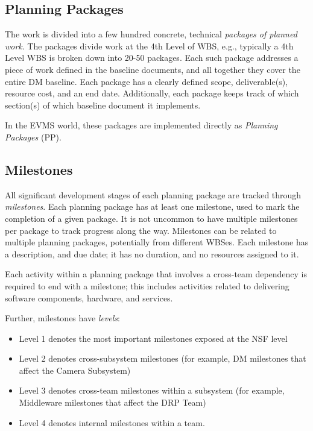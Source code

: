 \documentclass[DM,toc]{lsstdoc}
\newcommand{\sphinxstyleemphasis}{\emph}
\begin{document}
\subsection{Planning Packages}
\label{\detokenize{index:planning-packages}}
The work is divided into a few hundred concrete, technical \sphinxstyleemphasis{packages of planned work}. The packages divide work
at the 4th Level of WBS, e.g., typically a 4th Level WBS is broken down into 20-50 packages. Each such package
addresses a piece of work defined in the baseline documents, and all together they cover the entire DM baseline.
Each package has a clearly defined scope, deliverable(s), resource cost, and an end date. Additionally,
each package keeps track of which section(s) of which baseline document it implements.

In the EVMS world, these packages are implemented directly as \sphinxstyleemphasis{Planning Packages} (PP).


\subsection{Milestones}
\label{\detokenize{index:milestones}}
All significant development stages of each planning package are tracked through \sphinxstyleemphasis{milestones}.
Each planning package has at least one milestone, used to mark the completion of a given package.
It is not uncommon to have multiple milestones per package to track progress along the way.
Milestones can be related to multiple planning packages, potentially from different WBSes.
Each milestone has a description, and due date; it has no duration, and no resources assigned to it.

Each activity within a planning package that involves a cross-team dependency is required to end with
a milestone; this includes activities related to delivering software components, hardware, and services.

Further, milestones have \sphinxstyleemphasis{levels}:
\begin{itemize}
\item {}
Level 1 denotes the most important milestones exposed at the NSF level

\item {}
Level 2 denotes cross-subsystem milestones (for example, DM milestones that affect the Camera Subsystem)

\item {}
Level 3 denotes cross-team milestones within a subsystem (for example, Middleware milestones that affect the DRP Team)

\item {}
Level 4 denotes internal milestones within a team.

\end{itemize}
\end{document}
